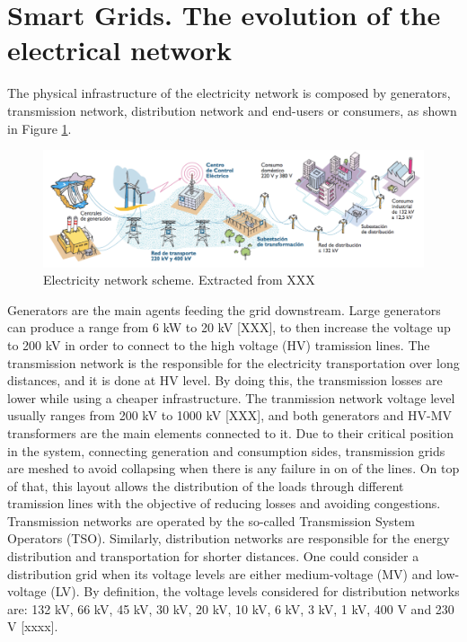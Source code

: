\section{Smart Grids. The evolution of the electrical network}

The physical infrastructure of the electricity network is composed by generators, transmission network, distribution network and end-users or consumers, as shown in Figure \ref{fig:ree}. 

\begin{figure}[h]
	\centering 
	\includegraphics[width=1\columnwidth ]{ChapterIntro/Figures/ree.png}
		\caption{Electricity network scheme. Extracted from XXX}  
		\label{fig:ree}
\end{figure}

Generators are the main agents feeding the grid downstream. Large generators can produce a range from 6 kW to 20 kV [XXX], to then increase the voltage up to 200 kV in order to connect to the high voltage (HV) tramission lines. The transmission network is the responsible for the electricity transportation over long distances, and it is done at HV level. By doing this, the transmission losses are lower while using a cheaper infrastructure. The tranmission network voltage level usually ranges from 200 kV to 1000 kV [XXX], and both generators and HV-MV transformers are the main elements connected to it. Due to their critical position in the system, connecting generation and consumption sides, transmission grids are meshed to avoid collapsing when there is any failure in on of the lines. On top of that, this layout allows the distribution of the loads through different tramission lines with the objective of reducing losses and avoiding congestions. Transmission networks are operated by the so-called Transmission System Operators (TSO). Similarly, distribution networks are responsible for the energy distribution and transportation for shorter distances. One could consider a distribution grid when its voltage levels are either medium-voltage (MV) and low-voltage (LV). By definition, the voltage levels considered for distribution networks are: 132 kV, 66 kV, 45 kV, 30 kV, 20 kV, 10 kV, 6 kV, 3 kV, 1 kV, 400 V and 230 V [xxxx]. 


